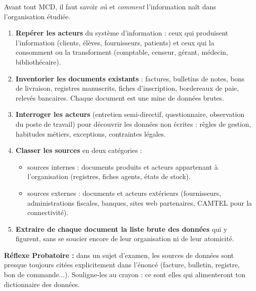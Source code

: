 \documentclass[11pt]{article}
\newcommand{\cle}[1]{{\popxbold\color{popdark}#1}}
\begin{document}
\begin{methode}
Avant tout MCD, il faut savoir \emph{où} et \emph{comment} l'information naît dans l'organisation étudiée.
\begin{enumerate}
  \item \textbf{Repérer les acteurs} du système d'information : ceux qui produisent l'information (clients, élèves, fournisseurs, patients) et ceux qui la consomment ou la transforment (comptable, censeur, gérant, médecin, bibliothécaire).
  \item \textbf{Inventorier les documents existants} : factures, bulletins de notes, bons de livraison, registres manuscrits, fiches d'inscription, bordereaux de paie, relevés bancaires. Chaque document est une mine de données brutes.
  \item \textbf{Interroger les acteurs} (entretien semi-directif, questionnaire, observation du poste de travail) pour découvrir les données non écrites : règles de gestion, habitudes métiers, exceptions, contraintes légales.
  \item \textbf{Classer les sources} en deux catégories :
  \begin{itemize}
    \item \cle{sources internes} : documents produits et acteurs appartenant à l'organisation (registres, fiches agents, états de stock).
    \item \cle{sources externes} : documents et acteurs extérieurs (fournisseurs, administrations fiscales, banques, sites web partenaires, CAMTEL pour la connectivité).
  \end{itemize}
  \item \textbf{Extraire de chaque document la liste brute des données} qui y figurent, sans se soucier encore de leur organisation ni de leur atomicité.
\end{enumerate}
\textbf{Réflexe Probatoire :} dans un sujet d'examen, les sources de données sont presque toujours citées explicitement dans l'énoncé (facture, bulletin, registre, bon de commande...). Souligne-les au crayon : ce sont elles qui alimenteront ton dictionnaire des données.
\end{methode}
\end{document}
